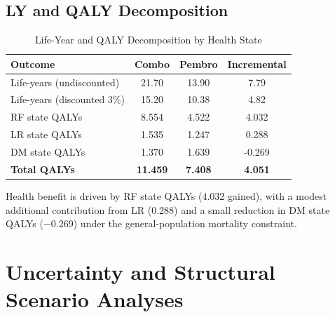 \documentclass[11pt,a4paper]{article}
\begin{document}
\subsection{LY and QALY Decomposition}
\label{sec:qaly_decomp}
\begin{table}[H]
\centering
\caption{Life-Year and QALY Decomposition by Health State}
\label{tab:s10}
\begin{tabular*}{\textwidth}{@{\extracolsep{\fill}}lccc}
\toprule
\textbf{Outcome} & \textbf{Combo} & \textbf{Pembro} & \textbf{Incremental} \\
\midrule
Life-years (undiscounted) & 21.70 & 13.90 & 7.79 \\
Life-years (discounted 3\%) & 15.20 & 10.38 & 4.82 \\
\midrule
RF state QALYs & 8.554 & 4.522 & 4.032 \\
LR state QALYs & 1.535 & 1.247 & 0.288 \\
DM state QALYs & 1.370 & 1.639 & -0.269 \\
\midrule
\textbf{Total QALYs} & \textbf{11.459} & \textbf{7.408} & \textbf{4.051} \\
\bottomrule
\end{tabular*}
\end{table}
Health benefit is driven by RF state QALYs (4.032 gained), with a modest additional contribution from LR (0.288) and a small reduction in DM state QALYs ($-$0.269) under the general-population mortality constraint.

\section{Uncertainty and Structural Scenario Analyses}
\end{document}
